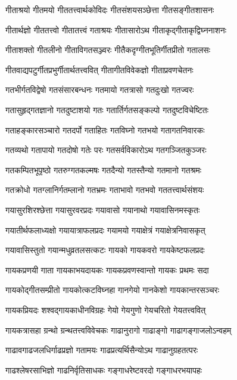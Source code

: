 \twolineshloka
{गीताश्रयो गीतमयो गीततत्त्वार्थकोविदः}%
{गीतसंशयसञ्छेत्ता गीतसङ्गीतशासनः}%

\twolineshloka
{गीतार्थज्ञो गीततत्त्वो गीतातत्त्वं गताश्रयः}%
{गीतासारोऽथ गीताकृद्गीताकृद्विघ्ननाशनः}%

\twolineshloka
{गीताशक्तो गीतलीनो गीताविगतसञ्ज्वरः}%
{गीतैकदृग्गीतभूतिर्गीतप्रीतो गतालसः}%

\twolineshloka
{गीतवाद्यपटुर्गीतप्रभुर्गीतार्थतत्त्ववित्}%
{गीतागीतविवेकज्ञो गीताप्रवणचेतनः}%

\twolineshloka
{गतभीर्गतविद्वेषो गतसंसारबन्धनः}%
{गतमायो गतत्रासो गतदुःखो गतज्वरः}%

\twolineshloka
{गतासुहृद्गतज्ञानो गतदुष्टाशयो गतः}%
{गतार्तिर्गतसङ्कल्पो गतदुष्टविचेष्टितः}%

\twolineshloka
{गताहङ्कारसञ्चारो गतदर्पो गताहितः}%
{गतविघ्नो गतभयो गतागतनिवारकः}%

\twolineshloka
{गतव्यथो गतापायो गतदोषो गतेः परः}%
{गतसर्वविकारोऽथ गतगञ्जितकुञ्जरः}%

\twolineshloka
{गतकम्पितभूपृष्ठो गतरुग्गतकल्मषः}%
{गतदैन्यो गतस्तैन्यो गतमानो गतश्रमः}%

\twolineshloka
{गतक्रोधो गतग्लानिर्गतम्लानो गतभ्रमः}%
{गताभावो गतभवो गततत्त्वार्थसंशयः}%

\twolineshloka
{गयासुरशिरश्छेत्ता गयासुरवरप्रदः}%
{गयावासो गयानाथो गयावासिनमस्कृतः}%

\twolineshloka
{गयातीर्थफलाध्यक्षो गयायात्राफलप्रदः}%
{गयामयो गयाक्षेत्रं गयाक्षेत्रनिवासकृत्}%

\twolineshloka
{गयावासिस्तुतो गयान्मधुव्रतलसत्कटः}%
{गायको गायकवरो गायकेष्टफलप्रदः}%

\twolineshloka
{गायकप्रणयी गाता गायकाभयदायकः}%
{गायकप्रवणस्वान्तो गायकः प्रथमः सदा}%

\twolineshloka
{गायकोद्गीतसम्प्रीतो गायकोत्कटविघ्नहा}%
{गानगेयो गानकेशो गायकान्तरसञ्चरः}%

\twolineshloka
{गायकप्रियदः शश्वद्गायकाधीनविग्रहः}%
{गेयो गेयगुणो गेयचरितो गेयतत्त्ववित्}%

\twolineshloka
{गायकत्रासहा ग्रन्थो ग्रन्थतत्त्वविवेचकः}%
{गाढानुरागो गाढाङ्गो गाढागङ्गाजलोऽन्वहम्}%

\twolineshloka
{गाढावगाढजलधिर्गाढप्रज्ञो गतामयः}%
{गाढप्रत्यर्थिसैन्योऽथ गाढानुग्रहतत्परः}%

\twolineshloka
{गाढश्लेषरसाभिज्ञो गाढनिर्वृतिसाधकः}%
{गङ्गाधरेष्टवरदो गङ्गाधरभयापहः}%

